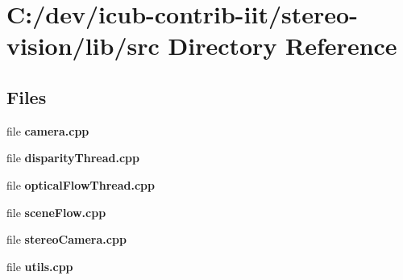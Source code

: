 \section{C\+:/dev/icub-\/contrib-\/iit/stereo-\/vision/lib/src Directory Reference}
\label{dir_a065c5f60305fee3569f887679366939}
\subsection*{Files}
\begin{DoxyCompactItemize}
\item 
file {\bfseries camera.\+cpp}
\item 
file {\bfseries disparity\+Thread.\+cpp}
\item 
file {\bfseries optical\+Flow\+Thread.\+cpp}
\item 
file {\bfseries scene\+Flow.\+cpp}
\item 
file {\bfseries stereo\+Camera.\+cpp}
\item 
file {\bfseries utils.\+cpp}
\end{DoxyCompactItemize}
